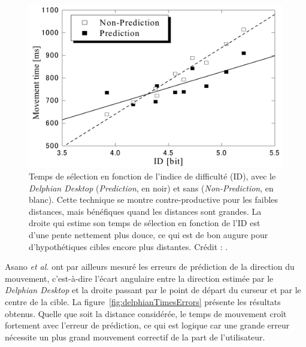 	\begin{figure}[H]
		\centering
		\includegraphics[width=\textwidth]{figures/ch2/delphianTimesID}
		\caption[\emph{Delphian Desktop} -- temps de sélection en fonction de l'ID]{Temps de sélection en fonction de l'indice de difficulté (ID), avec le \emph{Delphian Desktop} (\emph{Prediction}, en noir) et sans (\emph{Non-Prediction}, en blanc). Cette technique se montre contre-productive pour les faibles distances, mais bénéfiques quand les distances sont grandes. La droite qui estime son temps de sélection en fonction de l'ID est d'une pente nettement plus douce, ce qui est de bon augure pour d'hypothétiques cibles encore plus distantes. Crédit : \cite{asano2005predictive}.}
		\label{fig:delphianTimesID}
	\end{figure}
	
	Asano \emph{et al.} ont par ailleurs mesuré les erreurs de prédiction de la direction du mouvement, c'est-à-dire l'écart angulaire entre la direction estimée par le \emph{Delphian Desktop} et la droite passant par le point de départ du curseur et par le centre de la cible. La figure~\ref{fig:delphianTimesErrors} présente les résultats obtenus. Quelle que soit la distance considérée, le temps de mouvement croît fortement avec l'erreur de prédiction, ce qui est logique car une grande erreur nécessite un plus grand mouvement correctif de la part de l'utilisateur.
	
